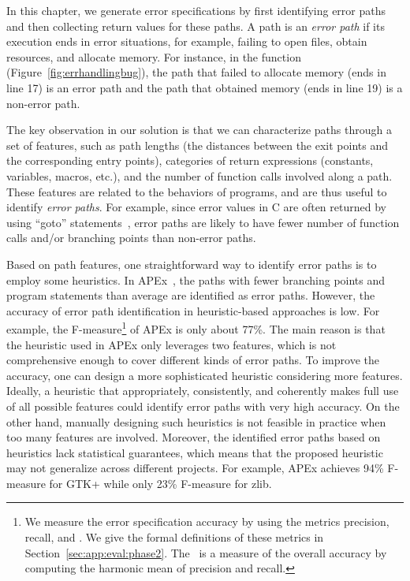 \documentclass[12pt]{report}	%
\begin{document}
In this chapter, we generate error specifications 
by first identifying error paths and then collecting
return values for these paths. 
A path is an 
\emph{error path} if its execution 
ends in error situations, 
for example, failing to open files, obtain resources, and allocate memory.
%
For instance, in the function  (Figure~\ref{fig:errhandlingbug}), the path that failed to allocate
memory (ends in line 17) is an error path and the path that obtained memory
(ends in line 19) is a non-error path. 

The key observation in our solution is that we can characterize paths
through a set of features, such as path lengths
(the distances between the exit points and the corresponding entry points),
categories of return expressions (constants, variables, macros, etc.),
and the number of function calls involved along a path.
%
These features are related to the behaviors of programs, 
and are thus useful to identify \emph{error paths}.
For example, since error values in C are often returned by using ``goto'' statements~\cite{Nagappan:2015:ESG:2786805.2786834},
error paths are likely to have fewer number of function calls and/or branching points than non-error paths.


Based on path features, one straightforward way to identify error paths is
to employ some heuristics.
In APEx~\cite{Kang:2016:AAI:2970276.2970354},
the paths with fewer branching points and program statements than average are identified as error paths.
However, the accuracy of error path identification in heuristic-based approaches 
is low.
For example, 
the F-measure\footnote{
We measure the error specification accuracy by using the metrics precision,
recall, and \accu. We give the formal definitions of these metrics in Section~\ref{sec:app:eval:phase2}.
The \accu\ is a measure of the overall accuracy by computing the harmonic mean of precision and recall.} 
of APEx is only about 77\%.
The main reason is that the heuristic used in APEx only leverages two features, 
which is not comprehensive enough to cover different kinds of error paths.
To improve the accuracy, one can design a more sophisticated 
heuristic considering more features.
Ideally, a heuristic that appropriately, consistently, and coherently 
makes full use of all possible features could 
identify error paths with very high accuracy.
On the other hand, manually designing such heuristics is not feasible in practice 
when too many features are involved. 
Moreover, the identified error paths based on heuristics lack statistical guarantees, 
which means that the proposed heuristic may not generalize across different projects.
For example, APEx achieves 94\% F-measure for GTK+ while only 23\% F-measure for zlib.
\end{document}
